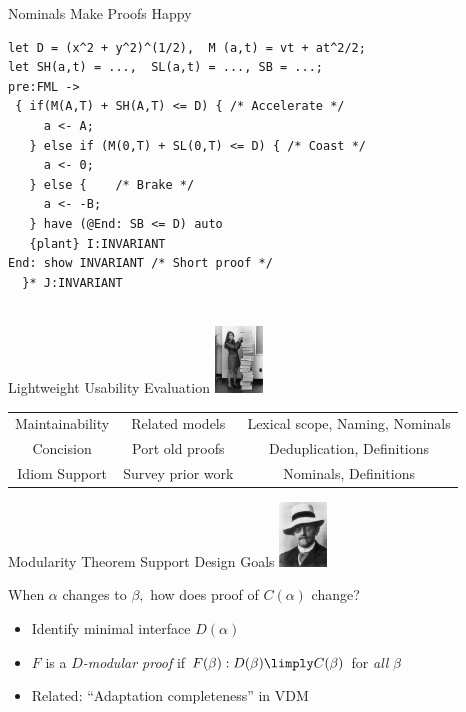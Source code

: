\documentclass[slidestop,aspectratio=169]{beamer}
\theoremstyle{plain}
\theoremstyle{definition}
\theoremstyle{remark}
\newcommand{\logician}[1][1in]{\includegraphics[width=#1]{img/hilbert.png}}
\newcommand{\logicuser}[1][1in]{\includegraphics[width=#1]{img/hamilton.png}}
\begin{document}
\begin{frame}[t,fragile]{Nominals Make Proofs Happy}
\begin{verbatim}
let D = (x^2 + y^2)^(1/2),  M (a,t) = vt + at^2/2;
let SH(a,t) = ...,  SL(a,t) = ..., SB = ...;
pre:FML ->
 { if(M(A,T) + SH(A,T) <= D) { /* Accelerate */
     a <- A;
   } else if (M(0,T) + SL(0,T) <= D) { /* Coast */
     a <- 0;
   } else {    /* Brake */
     a <- -B;
   } have (@End: SB <= D) auto
   {plant} I:INVARIANT
End: show INVARIANT /* Short proof */
  }* J:INVARIANT


\end{verbatim}
\end{frame}

\begin{frame}[t,fragile]{Lightweight Usability Evaluation}
\logicuser[0.5in]

\begin{center}
\begin{tabular}{ccc}
{\color{vblue}{Goal}}            & {\color{vblue}{How Evaluated}}     & {\color{vblue}{Supporting Features}} \\\hline
Maintainability & Related models    & Lexical scope, Naming, Nominals \\ \pause
Concision       & Port old proofs   & Deduplication, Definitions\\ \pause
Idiom Support   & Survey prior work & Nominals, Definitions
\end{tabular}
\end{center}
\end{frame}

\begin{frame}[t]{Modularity Theorem Support Design Goals}
\logician[0.5in]
\begin{center}
When $\alpha$ changes to $\beta,$ how does proof of $C(\alpha)$ change?
\begin{itemize}
\item Identify minimal interface $D(\alpha)$
\item $F$ is a $D$\emph{-modular proof} if $F(\beta): D(\beta) \limply C(\beta)$ for \emph{all} $\beta$
\item Related: ``Adaptation completeness'' in VDM
\end{itemize}
\end{center}
\end{frame}
\end{document}
